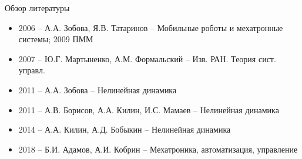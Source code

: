 \begin{frame}{Обзор литературы}
    \begin{itemize}
        \item 2006 -- А.А. Зобова, Я.В. Татаринов -- Мобильные роботы и мехатронные системы; 2009 ПММ
        \item 2007 -- Ю.Г. Мартыненко, А.М. Формальский -- Изв. РАН. Теория сист. управл.
        \item 2011 -- А.А. Зобова -- Нелинейная динамика
        \item 2011 -- А.В. Борисов, А.А. Килин, И.С. Мамаев -- Нелинейная динамика
        \item 2014 -- А.А. Килин, А.Д. Бобыкин -- Нелинейная динамика
        \item 2018 -- Б.И. Адамов, А.И. Кобрин -- Мехатроника, автоматизация, управление
    \end{itemize}
\end{frame}

